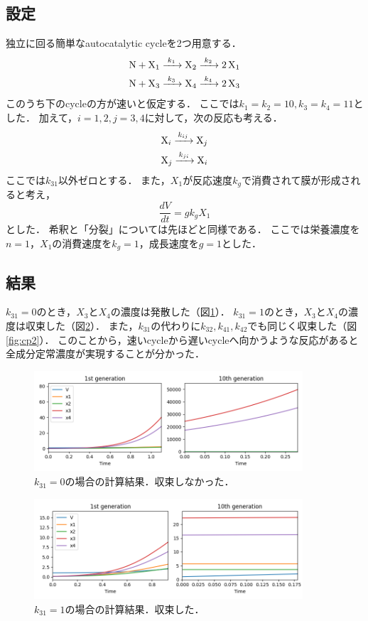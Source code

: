 \documentclass[a4paper,11pt]{jsarticle}
\begin{document}
\subsection{設定}
独立に回る簡単なautocatalytic cycleを2つ用意する．
\begin{align}
  \ce{N + X_1 ->[$k_1$] X_2 ->[$k_2$] 2X_1}\\
  \ce{N + X_3 ->[$k_3$] X_4 ->[$k_4$] 2X_3}
\end{align}
このうち下のcycleの方が速いと仮定する．
ここでは$k_1=k_2=10, k_3=k_4=11$とした．
加えて，$i=1,2,  j=3,4$に対して，次の反応も考える．
\begin{align}
  \ce{X_i ->[$k_{ij}$] X_j}  \\
  \ce{X_j ->[$k_{ji}$] X_i} 
\end{align}
ここでは$k_{31}$以外ゼロとする．
また，$X_1$が反応速度$k_g$で消費されて膜が形成されると考え，
\begin{equation}
  \frac{dV}{dt} = g k_g X_1
\end{equation}
とした．
希釈と「分裂」については先ほどと同様である．
ここでは栄養濃度を$n=1$，$X_1$の消費速度を$k_g = 1$，成長速度を$g=1$とした．

\subsection{結果}
$k_{31}=0$のとき，$X_3$と$X_4$の濃度は発散した（図\ref{fig:cp0}）．
$k_{31}=1$のとき，$X_3$と$X_4$の濃度は収束した（図\ref{fig:cp1}）．
また，$k_{31}$の代わりに$k_{32}, k_{41}, k_{42}$でも同じく収束した（図\ref{fig:cp2}）．
このことから，速いcycleから遅いcycleへ向かうような反応があると全成分定常濃度が実現することが分かった．

\begin{figure}[htbp]
  \centering
  \includegraphics[width=10cm]{couple_pure_k31=0.png}
  \caption{$k_{31}=0$の場合の計算結果．収束しなかった．}
  \label{fig:cp0}
\end{figure}

\begin{figure}[htbp]
  \centering
  \includegraphics[width=10cm]{couple_pure_k31=1.png}
  \caption{$k_{31}=1$の場合の計算結果．収束した．}
  \label{fig:cp1}
\end{figure}
\end{document}
